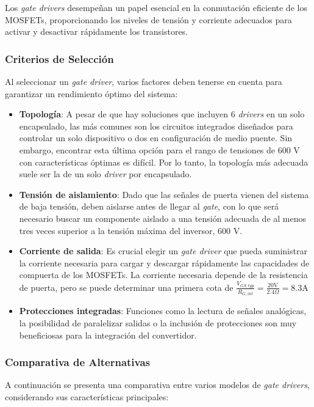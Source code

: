 Los \textit{gate drivers} desempeñan un papel esencial en la conmutación eficiente de los MOSFETs, proporcionando los niveles de tensión y corriente adecuados para activar y desactivar rápidamente los transistores. 

\subsubsection{Criterios de Selección}

Al seleccionar un \textit{gate driver}, varios factores deben tenerse en cuenta para garantizar un rendimiento óptimo del sistema:

\begin{itemize}
	\item \textbf{Topología}: A pesar de que hay soluciones que incluyen 6 \textit{drivers} en un solo encapsulado, las más comunes son los circuitos integrados diseñados para controlar un solo dispositivo o dos en configuración de medio puente. Sin embargo, encontrar esta última opción para el rango de tensiones de 600 V con características óptimas es difícil. Por lo tanto, la topología más adecuada suele ser la de un solo \textit{driver} por encapsulado.
	\item \textbf{Tensión de aislamiento}: Dado que las señales de puerta vienen del sistema de baja tensión, deben aislarse antes de llegar al \textit{gate}, con lo que será necesario buscar un componente aislado a una tensión adecuada de al menos tres veces superior a la tensión máxima del inversor, 600 V. 
	\item \textbf{Corriente de salida}: Es crucial elegir un \textit{gate driver} que pueda suministrar la corriente necesaria para cargar y descargar rápidamente las capacidades de compuerta de los MOSFETs. La corriente necesaria depende de la resistencia de puerta, pero se puede determinar una primera cota de $\frac{V_{GS,typ}}{R_{G,int}} = \frac{20 \text{V}}{2.4 \Omega} = 8.3 \text{A}$
	\item \textbf{Protecciones integradas}: Funciones como la lectura de señales analógicas, la posibilidad de paralelizar salidas o la inclusión de protecciones son muy beneficiosas para la integración del convertidor.
\end{itemize}

\subsubsection{Comparativa de Alternativas}

A continuación se presenta una comparativa entre varios modelos de \textit{gate drivers}, considerando sus características principales:

